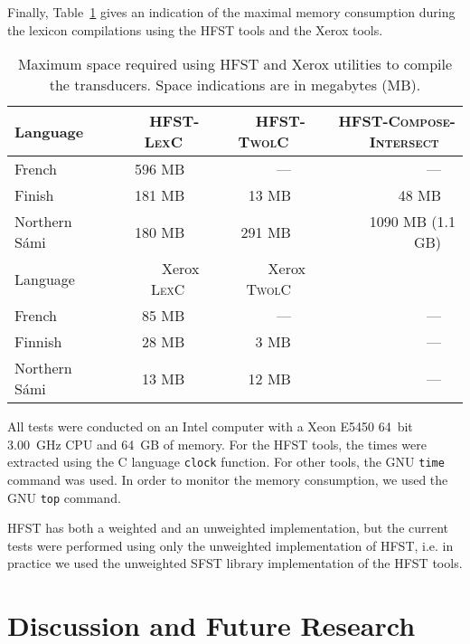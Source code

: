 \documentclass[a4paper]{article}
\begin{document}
Finally, Table~\ref{fig:memory-consumption} gives an indication of the
maximal memory consumption during the lexicon compilations using the
\textsc{HFST} tools and the Xerox tools.

\begin{table}[!h]
  \begin{center}
    \begin{tabular}{lrrr}
      \hline
      Language & ~~\textsc{HFST-LexC}~~ & ~~\textsc{HFST-TwolC}~~ & ~~\textsc{HFST-Compose-Intersect}~~ \\
      \hline
      French & 596 MB~~ & ---~~ & ---~~ \\
      Finish & 181 MB~~ & 13 MB~~ & 48 MB~~ \\
      Northern S\'ami~~ & ~~180 MB~~ & ~~291 MB~~ & ~~1090 MB (1.1 GB)~~ \\
      \hline
      Language & ~~Xerox \textsc{LexC}~~ & ~~Xerox \textsc{TwolC}~~ & \\
      \hline
      French & ~~85 MB~~ & ~~---~~ & ~~---~~ \\
      Finnish & ~~28 MB~~ & ~~3 MB~~ & ~~---~~ \\
      Northern S\'ami~~ & ~~13 MB~~ & ~~12 MB~~ & ~~---~~ \\
      \hline
    \end{tabular}
    \vskip0.5cm
    \caption{Maximum space required using \textsc{HFST} and Xerox
    utilities to compile the transducers. Space indications are in
    megabytes (MB).}\label{fig:memory-consumption}
  \end{center}
\end{table}

All tests were conducted on an Intel computer with a Xeon E5450 64~bit
3.00~GHz CPU and 64~GB of memory. For the \textsc{HFST} tools, the
times were extracted using the C language \verb|clock| function. For
other tools, the GNU \verb|time| command was used. In order to monitor
the memory consumption, we used the GNU \verb|top| command.

\textsc{HFST} has both a weighted and an unweighted implementation,
but the current tests were performed using only the unweighted
implementation of \textsc{HFST}, i.e. in practice we used the
unweighted \textsc{SFST} library implementation of the \textsc{HFST}
tools.

\section{Discussion and Future Research}
\end{document}
